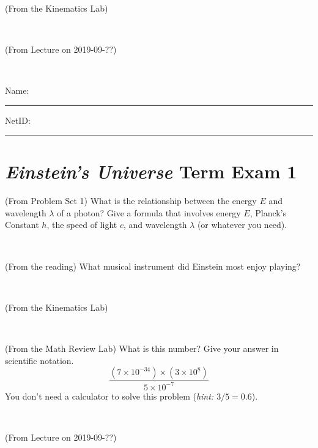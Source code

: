 \documentclass[12pt, letterpaper]{article}
\begin{document}
\vfill ~

\begin{problem} (From the Kinematics Lab)

\end{problem}


\vfill ~

\begin{problem} (From Lecture on 2019-09-??)
\end{problem}


\vfill ~


\cleardoublepage



\noindent
Name: \rule[-1ex]{0.60\textwidth}{0.1pt}
NetID: \rule[-1ex]{0.20\textwidth}{0.1pt}

\section*{\textsl{Einstein's Universe} Term Exam 1}
\setcounter{problem}{1}


\begin{problem} (From Problem Set 1)
What is the relationship between the energy $E$ and wavelength
$\lambda$ of a photon? Give a formula that involves energy $E$,
Planck's Constant $h$, the speed of light $c$, and wavelength
$\lambda$ (or whatever you need).
\end{problem}

\vfill ~

\begin{problem} (From the reading)
What musical instrument did Einstein most enjoy playing?
\end{problem}


\vfill ~

\begin{problem} (From the Kinematics Lab)

\end{problem}


\vfill ~

\begin{problem} (From the Math Review Lab)
What is this number? Give your answer in scientific notation.
$$
\frac{(7\times10^{-34})\times(3\times10^8)}{5\times10^{-7}}
$$
You don't need a calculator to solve this problem (\textit{hint: $3/5=0.6$}).
\end{problem}


\vfill ~


\clearpage


\begin{problem} (From Lecture on 2019-09-??)
\end{problem}
\end{document}
